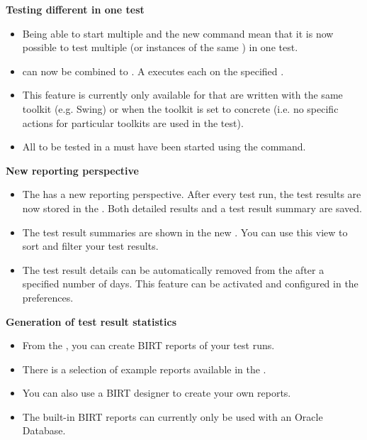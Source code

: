 \textbf{Testing different \gdauts{} in one test}
\begin{itemize}
\item Being able to start multiple \gdauts{} and the new  command mean that it is now possible to test multiple \gdauts{} (or instances of the same \gdaut{}) in one test.
\item \gdsuites{} can now be combined to \gdjobs{}. A \gdjob{} executes each \gdsuite{} on the specified \gdaut{}.
\item This feature is currently only available for \gdauts{} that are written with the same toolkit (e.g. Swing) or when the \gdproject{} toolkit is set to concrete (i.e. no specific actions for particular toolkits are used in the test).
\item All \gdauts{} to be tested in a \gdjob{} must have been started using the  command.
\end{itemize}
\textbf{New reporting perspective}
\begin{itemize}
\item The \ite{} has a new reporting perspective. After every test run, the test results are now stored in the \gddb{}. Both detailed results and a test result summary are saved.
\item The test result summaries are shown in the new \gdtestsummaryview{}. You can use this view to sort and filter your test results. 
\item The test result details can be automatically removed from the \gddb{} after a specified number of days. This feature can be activated and configured in the preferences.
\end{itemize}
\textbf{Generation of test result statistics}
\begin{itemize}
\item From the \gdtestsummaryview{}, you can create BIRT reports of your test runs. 
\item There is a selection of example reports available in the \gdtestsummaryview{}.
\item You can also use a BIRT designer to create your own reports.
\item The built-in BIRT reports can currently only be used with an Oracle Database. 
\end{itemize}

